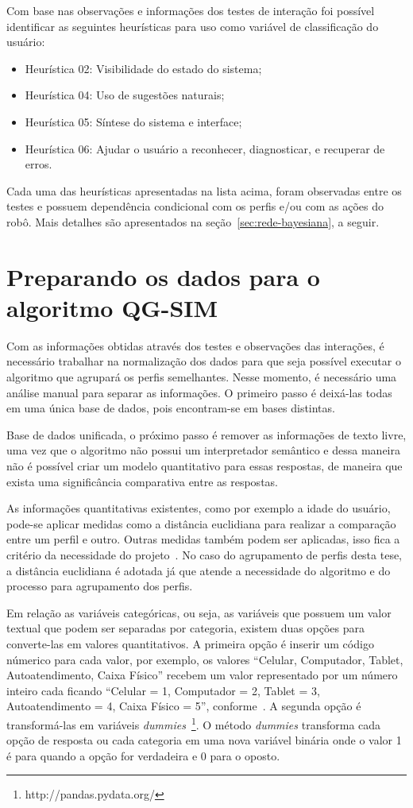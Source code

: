 Com base nas observações e informações dos testes de interação foi possível identificar as seguintes heurísticas para uso como variável de classificação do usuário:

\begin{itemize}
	\item Heurística 02: Visibilidade do estado do sistema;
	\item Heurística 04: Uso de sugestões naturais;
	\item Heurística 05: Síntese do sistema e interface;
	\item Heurística 06: Ajudar o usuário a reconhecer, diagnosticar, e recuperar de erros.
\end{itemize}

Cada uma das heurísticas apresentadas na lista acima, foram observadas entre os testes e possuem dependência condicional com os perfis e/ou com as ações do robô. Mais detalhes são apresentados na seção~\ref{sec:rede-bayesiana}, a seguir.

\section{Preparando os dados para o algoritmo QG-SIM}
\label{sec:preparacao}
Com as informações obtidas através dos testes e observações das interações, é necessário trabalhar na normalização dos dados para que seja possível executar o algoritmo que agrupará os perfis semelhantes. Nesse momento, é necessário uma análise manual para separar as informações. O primeiro passo é deixá-las todas em uma única base de dados, pois encontram-se em bases distintas.

Base de dados unificada, o próximo passo é remover as informações de texto livre, uma vez que o algoritmo não possui um interpretador semântico e dessa maneira não é possível criar um modelo quantitativo para essas respostas, de maneira que exista uma significância comparativa entre as respostas.

As informações quantitativas existentes, como por exemplo a idade do usuário, pode-se aplicar medidas como a distância euclidiana para realizar a comparação entre um perfil e outro. Outras medidas também podem ser aplicadas, isso fica a critério da necessidade do projeto~\cite{masiero:2013}. No caso do agrupamento de perfis desta tese, a distância euclidiana é adotada já que atende a necessidade do algoritmo e do processo para agrupamento dos perfis.

Em relação as variáveis categóricas, ou seja, as variáveis que possuem um valor textual que podem ser separadas por categoria, existem duas opções para converte-las em valores quantitativos. A primeira opção é inserir um código númerico para cada valor, por exemplo, os valores ``Celular, Computador, Tablet, Autoatendimento, Caixa Físico'' recebem um valor representado por um número inteiro cada ficando ``Celular = 1, Computador = 2, Tablet = 3, Autoatendimento = 4, Caixa Físico = 5'', conforme~. A segunda opção é transformá-las em variáveis \emph{dummies}~\footnote{http://pandas.pydata.org/}. O método \emph{dummies} transforma cada opção de resposta ou cada categoria em uma nova variável binária onde o valor 1 é para quando a opção for verdadeira e 0 para o oposto.

